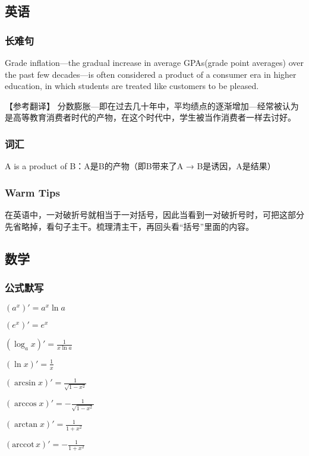 \documentclass[UTF8]{ctexart}
\newcommand{\arccot}{\mathrm{arccot}\,}
\begin{document}
\subsection{英语}
\subsubsection{长难句}
Grade inflation---the gradual increase in average GPAs(grade point averages) over the past few decades---is often considered a product of a consumer era in higher education, in which students are treated like customers to be pleased.

【参考翻译】
分数膨胀---即在过去几十年中，平均绩点的逐渐增加---经常被认为是高等教育消费者时代的产物，在这个时代中，学生被当作消费者一样去讨好。
\subsubsection{词汇}
A is a product of B：A是B的产物（即B带来了A → B是诱因，A是结果）
\subsubsection{Warm Tips}
在英语中，一对破折号就相当于一对括号，因此当看到一对破折号时，可把这部分先省略掉，看句子主干。梳理清主干，再回头看“括号”里面的内容。
\subsection{数学}
\subsubsection{公式默写}
\begin{multicols}{3}
      $(a^x)'=a^x\ln a$

      $(e^x)'=e^x$

      $(\log_a x)'=\frac{1}{x\ln a}$

      $(\ln x)'=\frac{1}{x}$

      $(\arcsin x)'=\frac{1}{\sqrt{1-x^2}}$

      $(\arccos x)'=-\frac{1}{\sqrt{1-x^2}}$

      $(\arctan x)'=\frac{1}{1+x^2}$

      $(\arccot x)'=-\frac{1}{1+x^2}$
\end{multicols}
\end{document}
